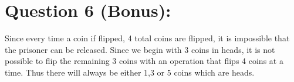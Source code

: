 \documentclass{article}
\begin{document}
\newpage
\section*{Question 6 (Bonus):}
Since every time a coin if flipped, 4 total coins are flipped, it is impossible that the prisoner can be released. Since we begin with 3 coins in heads, it is not possible to flip the remaining 3 coins with an operation that flips 4 coins at a time. Thus there will always be either 1,3 or 5 coins which are heads.
\end{document}
